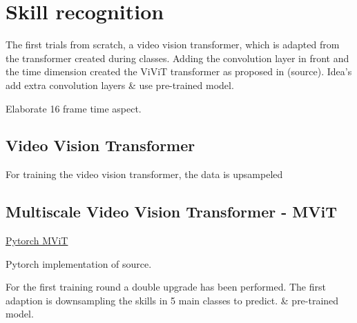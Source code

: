 \section{Skill recognition}

The first trials from scratch, a video vision transformer, which is adapted from the transformer created during classes. Adding the convolution layer in front and the time dimension created the ViViT transformer as proposed in (source).
Idea's add extra convolution layers \& use pre-trained model.

Elaborate 16 frame time aspect.

\subsection{Video Vision Transformer}

For training the video vision transformer, the data is upsampeled

\subsection{Multiscale Video Vision Transformer - MViT}
\href{https://pytorch.org/vision/main/models/video_mvit.html}{Pytorch MViT}

Pytorch implementation of source.

For the first training round a double upgrade has been performed. The first adaption is downsampling the skills in 5 main classes to predict.  \& pre-trained model.

